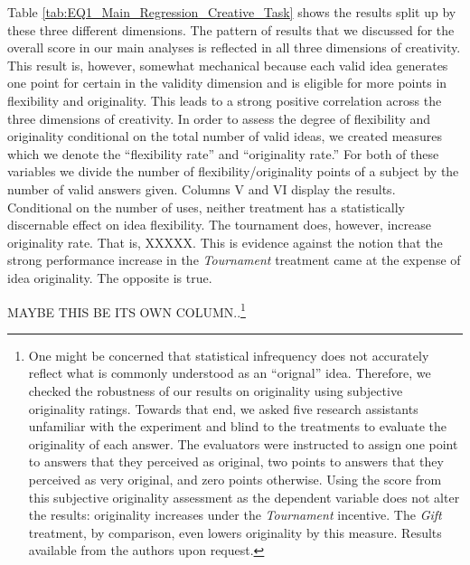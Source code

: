 Table \ref{tab:EQ1_Main_Regression_Creative_Task} shows the results split 
up by these three different dimensions. The pattern of results that we discussed for the 
overall score in our main analyses
 is reflected in all three dimensions of creativity. This result is, however, somewhat mechanical because
 each valid idea generates one point for certain in the validity dimension and is eligible for more points in flexibility and originality.
This leads to a strong positive correlation across the three dimensions of creativity. 
In order to assess the degree of flexibility and originality conditional on the total number of valid ideas, 
we created measures which we denote the ``flexibility rate'' and ``originality rate.''
For both of these variables we divide the number of flexibility/originality points of a subject by the number of valid answers given.
Columns V and VI display the results. Conditional on the number of uses, neither treatment has a statistically discernable 
effect on idea flexibility. The tournament does, however,  increase originality rate. That is, XXXXX.
This is  evidence against the notion that the strong performance increase in the 
\textit{Tournament} treatment came at the expense of idea originality. The opposite is true.


MAYBE THIS BE ITS OWN COLUMN..\footnote{One might be 
concerned that statistical infrequency does not accurately reflect what is commonly understood as an
 ``orignal'' idea. Therefore, we checked the robustness of  our results on originality 
using subjective originality ratings. Towards that end, we asked five research 
assistants unfamiliar with the experiment and blind to the treatments to evaluate 
the originality of each answer. The evaluators were instructed to assign one  point 
to answers that they perceived as original, two points to answers that they perceived 
as very original, and zero points otherwise. 
Using the score from this subjective originality assessment as the dependent variable 
does not alter the results: originality increases under the \textit{Tournament} incentive. 
The \textit{Gift} treatment, by comparison, even lowers originality by this measure. Results available 
from the authors upon request.} 

